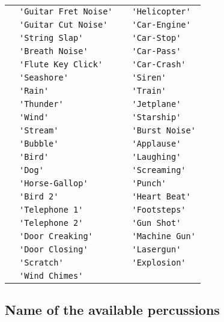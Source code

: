 \documentclass{article}
\newcommand\lvlo{}
\newcommand\lvlt{\ding{105}}
\begin{document}
\begin{center}
\begin{longtable}{ll|ll}
 \lvlo & \lstinline!'Guitar Fret Noise'! & \lvlo & \lstinline!'Helicopter'! \\
 \lvlt & \lstinline!'Guitar Cut Noise'! & \lvlt & \lstinline!'Car-Engine'! \\
 \lvlt & \lstinline!'String Slap'! & \lvlt & \lstinline!'Car-Stop'! \\
 \lvlo & \lstinline!'Breath Noise'! & \lvlt & \lstinline!'Car-Pass'! \\
 \lvlt & \lstinline!'Flute Key Click'! & \lvlt & \lstinline!'Car-Crash'! \\
 \lvlo & \lstinline!'Seashore'! & \lvlt & \lstinline!'Siren'! \\
 \lvlt & \lstinline!'Rain'! & \lvlt & \lstinline!'Train'! \\
 \lvlt & \lstinline!'Thunder'! & \lvlt & \lstinline!'Jetplane'! \\
 \lvlt & \lstinline!'Wind'! & \lvlt & \lstinline!'Starship'! \\
 \lvlt & \lstinline!'Stream'! & \lvlt & \lstinline!'Burst Noise'! \\
 \lvlt & \lstinline!'Bubble'! & \lvlo & \lstinline!'Applause'! \\
 \lvlo & \lstinline!'Bird'! & \lvlt & \lstinline!'Laughing'! \\
 \lvlt & \lstinline!'Dog'! & \lvlt & \lstinline!'Screaming'! \\
 \lvlt & \lstinline!'Horse-Gallop'! & \lvlt & \lstinline!'Punch'! \\
 \lvlt & \lstinline!'Bird 2'! & \lvlt & \lstinline!'Heart Beat'! \\
 \lvlo & \lstinline!'Telephone 1'! & \lvlt & \lstinline!'Footsteps'! \\
 \lvlt & \lstinline!'Telephone 2'! & \lvlo & \lstinline!'Gun Shot'! \\
 \lvlt & \lstinline!'Door Creaking'! & \lvlt & \lstinline!'Machine Gun'! \\
 \lvlt & \lstinline!'Door Closing'! & \lvlt & \lstinline!'Lasergun'! \\
 \lvlt & \lstinline!'Scratch'! & \lvlt & \lstinline!'Explosion'! \\
 \lvlt & \lstinline!'Wind Chimes'! \\
\end{longtable}
\end{center}

\subsection{Name of the available percussions}
\label{sec:AvailPercussion}
\end{document}
